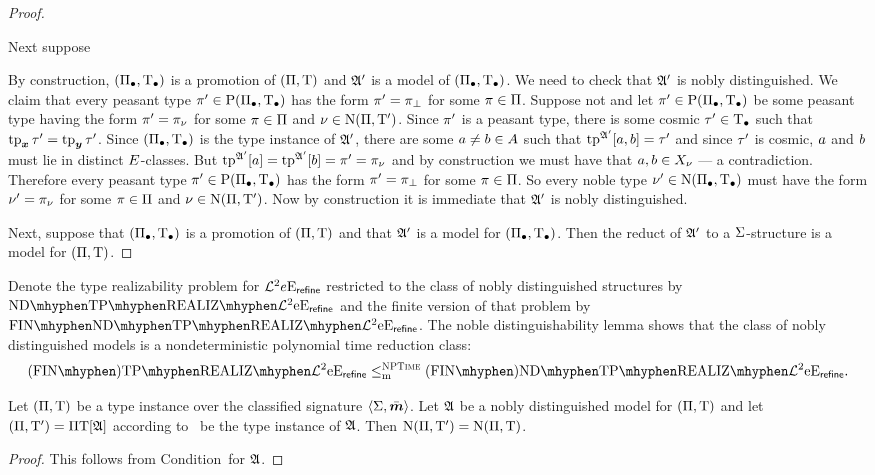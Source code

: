 \begin{proof}
\begin{itemize}
  Next suppose 
\end{itemize}

 By
construction, $(\Pi_{\bullet},\mathrm{T}_{\bullet})$ is a promotion of $(\Pi,\mathrm{T})$ and $\mathfrak{A'}$ is a
model of $(\Pi_{\bullet},\mathrm{T}_{\bullet})$.
We need to check that $\mathfrak{A'}$ is nobly distinguished.
We claim that every peasant type ${\pi'} \in \mathrm{P}(\Pi_{\bullet},\mathrm{T}_{\bullet})$ has the form
${\pi'} = {\pi}_{\bot}$ for some $\pi\in\Pi$.
Suppose not and let ${\pi'}\in \mathrm{P}(\Pi_{\bullet},\mathrm{T}_{\bullet})$ be some peasant type having
the form ${\pi'} = {\pi}_{\nu}$ for some $\pi\in\Pi$ and
$\nu\in\mathrm{\mathrm{N}}(\Pi,{\mathrm{T}'})$. 
Since ${\pi'}$ is a peasant type, there is some cosmic ${\tau'} \in \mathrm{T}_{\bullet}$ such
that $\operatorname{tp}_{\bm{x}}{\tau'} = \operatorname{tp}_{\bm{y}}{\tau'}$. Since $(\Pi_{\bullet},\mathrm{T}_{\bullet})$ is the type instance of
$\mathfrak{A'}$, there are some $a \neq b \in A$ such that $\operatorname{tp}^{\mathfrak{A'}}[a,b] = {\tau'}$ and
since ${\tau'}$ is cosmic, $a$ and $b$ must lie in distinct $E$-classes.
But $\operatorname{tp}^{\mathfrak{A'}}[a] = \operatorname{tp}^{\mathfrak{A'}}[b] = {\pi'} = {\pi}_{\nu}$ and by
construction we must have that $a, b \in X_\nu$ --- a contradiction.
Therefore every peasant type ${\pi'} \in \mathrm{P}(\Pi_{\bullet},\mathrm{T}_{\bullet})$ has the form
${\pi'} = {\pi}_{\bot}$ for some $\pi \in \Pi$. So every noble type ${\nu'}
\in \mathrm{\mathrm{N}}(\Pi_{\bullet},\mathrm{T}_{\bullet})$ must have the form ${\nu'} = {\pi}_{\nu}$ for some
$\pi \in \Pi$ and $\nu \in \mathrm{\mathrm{N}}(\Pi,{\mathrm{T}'})$. Now by construction it is
immediate that $\mathfrak{A'}$ is nobly distinguished.

Next, suppose that $(\Pi_{\bullet},\mathrm{T}_{\bullet})$ is a promotion of $(\Pi,\mathrm{T})$ and
that $\mathfrak{A'}$ is a model for $(\Pi_{\bullet},\mathrm{T}_{\bullet})$. Then the reduct of $\mathfrak{A'}$
to a $\mathrm{\Sigma}$-structure is a model for $(\Pi,\mathrm{T})$.
\end{proof}
Denote the type realizability problem for $\mathcal{L}^{2}{e}\mathrm{E}_{\mathsf{refine}}$ restricted to
the class of nobly distinguished structures by $\NDReal{\vFo2\Eea\sze\agrefine}$ and the finite
version of that problem by $\FinNDReal{\vFo2\Eea\sze\agrefine}$.
The noble distinguishability lemma shows that the class of nobly distinguished
models is a nondeterministic polynomial time reduction class:
\[
  \FinAReal{\vFo2\Eea\sze\agrefine} \red{\cNP} \FinANDReal{\vFo2\Eea\sze\agrefine}.
\]

\begin{remark}
Let $(\Pi,\mathrm{T})$ be a type instance over the classified signature
$\left\langle \mathrm{\Sigma},\bar{\bm{m}} \right\rangle$. Let $\mathfrak{A}$ be a nobly distinguished model for
$(\Pi,\mathrm{T})$ and let $(\Pi,{\mathrm{T}'}) = \Pi\mathrm{T}[\mathfrak{A}]$ according
to~ be the type instance of $\mathfrak{A}$. Then
$\mathrm{\mathrm{N}}(\Pi,{\mathrm{T}'}) = \mathrm{\mathrm{N}}(\Pi,\mathrm{T})$.
\end{remark}
\begin{proof}
This follows from Condition~ for $\mathfrak{A}$.
\end{proof}

